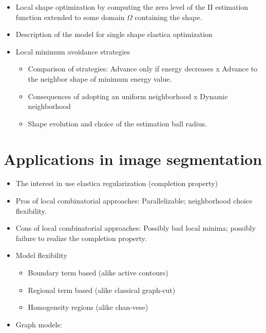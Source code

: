 \documentclass[12pt]{article}
\begin{document}
\begin{itemize}
\item{Local shape optimization by computing the zero level of the II estimation function extended to some domain $\Omega$ containing the shape.}
\item{Description of the model for single shape elastica optimization}
\item{Local minimum avoidance strategies
	\begin{itemize}
	\item{Comparison of strategies: Advance only if energy decreases x Advance to the neighbor shape of minimum energy value.}
	\item{Consequences of adopting an uniform neighborhood x Dynamic neighborhood}
	\item{Shape evolution and choice of the estimation ball radius.}
	\end{itemize}
}
\end{itemize}
%
%
\section{Applications in image segmentation}
\begin{itemize}
\item{The interest in use elastica regularization (completion property) }
\item{Pros of local combinatorial approaches: Parallelizable; neighborhood choice flexibility. }
\item{Cons of local combinatorial approaches: Possibly bad local minima; possibly failure to realize the completion property.}
\item{Model flexibility
\begin{itemize}
\item{Boundary term based (alike active contours)}
\item{Regional term based (alike classical graph-cut)}
\item{Homogeneity regions (alike chan-vese)}
\end{itemize}
}
\item{Graph models: \cite{rother04grabcut}
\cite{boykov01graphcut}
}
\end{itemize}
%
%
%


\end{document}
